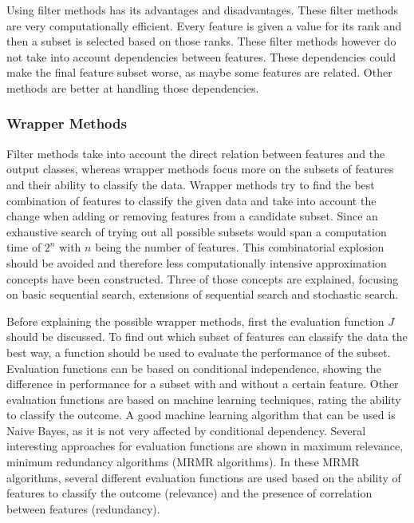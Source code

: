 \documentclass[10pt,a4paper]{article}
\begin{document}
	Using filter methods has its advantages and disadvantages. These filter methods are very computationally efficient. Every feature is given a value for its rank and then a subset is selected based on those ranks. These filter methods however do not take into account dependencies between features. These dependencies could make the final feature subset worse, as maybe some features are related. Other methods are better at handling those dependencies\cite{Duch2006, saeys2007review}.
	
	\subsubsection{Wrapper Methods}
	\label{subsec:WrapperMethods}
	
	Filter methods take into account the direct relation between features and the output classes, whereas wrapper methods focus more on the subsets of features and their ability to classify the data. Wrapper methods try to find the best combination of features to classify the given data and take into account the change when adding or removing features from a candidate subset\cite{Reunanen2006}. Since an exhaustive search of trying out all possible subsets would span a computation time of $2^n$ with $n$ being the number of features\cite{Alsallakh2016PowerSet}. This combinatorial explosion should be avoided and therefore less computationally intensive approximation concepts have been constructed. Three of those concepts are explained, focusing on basic sequential search, extensions of sequential search and stochastic search.
	
	Before explaining the possible wrapper methods, first the evaluation function $J$ should be discussed. To find out which subset of features can classify the data the best way, a function should be used to evaluate the performance of the subset\cite{Reunanen2006}. Evaluation functions can be based on conditional independence\cite{Reunanen2006,tsamardinos2017massively}, showing the difference in performance for a subset with and without a certain feature. Other evaluation functions are based on machine learning techniques\cite{huang2013automated, saeys2007review}, rating the ability to classify the outcome. A good machine learning algorithm that can be used is Naive Bayes, as it is not very affected by conditional dependency\cite{zhang2004optimality}. Several interesting approaches for evaluation functions are shown in maximum relevance, minimum redundancy algorithms\cite{SENAWI201747, el2009new, radovic2017minimum} (MRMR algorithms). In these MRMR algorithms, several different evaluation functions are used based on the ability of features to classify the outcome (relevance) and the presence of correlation between features (redundancy).
	
\end{document}
